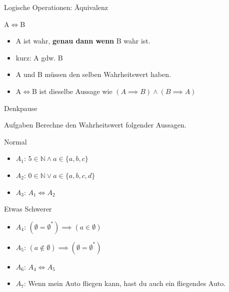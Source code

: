 \documentclass[10pt]{beamer}
\begin{document}
\begin{frame}{Logische Operationen: Äquivalenz}
\begin{alertblock}{A$\iff$B}
\begin{itemize}
    \item \dq A ist wahr, \textbf{genau dann wenn} B wahr ist.\dq
    \item kurz: \dq A gdw. B\dq
    \item A und B müssen den selben Wahrheitswert haben.
    \item A$\iff$B ist dieselbe Aussage wie $(A \implies B) \wedge (B \implies A)$
\end{itemize}
\end{alertblock}
\end{frame}

{
\begin{frame}[fragile]{Denkpause}
    \begin{alertblock}{Aufgaben}
      Berechne den Wahrheitswert folgender Aussagen. 
    \end{alertblock}
    \begin{block}{Normal}
    \begin{itemize}
        \item $A_1$: $5 \in \mathbb{N} \wedge a \in \{a, b, c\}$
        \item $A_2$: $0 \in \mathbb{N} \vee a \in \{a, b, c, d\}$
        \item $A_3$: $A_1 \iff A_2$
    \end{itemize}
    \end{block}
    \begin{block}{Etwas Schwerer}
    \begin{itemize}
        \item $A_4$: $(\emptyset=\emptyset^{*}) \implies (a \in \emptyset)$
        \item $A_5$: $(a \notin \emptyset) \implies (\emptyset = \emptyset^{*})$
        \item $A_6$: $A_4 \iff A_5$
        \item $A_7$: Wenn mein Auto fliegen kann, hast du auch ein fliegendes Auto.
    \end{itemize}
    \end{block}
\end{frame}
}

\end{document}
